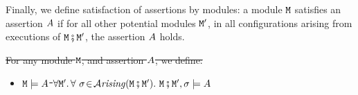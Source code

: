 Finally, we define satisfaction of assertions by modules: a module
${\mbox{\tt{\ensuremath{{\mbox{\tt{M}}}}}}}$ satisfies an assertion $A$ if for all other potential modules ${\mbox{\tt{\ensuremath{{\mbox{\tt{M}}}}}}}'$, in all configurations arising from executions of ${\mbox{\tt{\ensuremath{{\mbox{\tt{M}}}}}}}\fatsemi{\mbox{\tt{\ensuremath{{\mbox{\tt{M}}}}}}}'$, the assertion $A$ holds.

\begin{definition}
\label{def:module_satisfies}
\sout{For any module ${\mbox{\tt{\ensuremath{{\mbox{\tt{M}}}}}}}$, and  assertion $A$, we define:}
\begin{itemize}
\item\sout{
${\mbox{\tt{\ensuremath{{\mbox{\tt{M}}}}}}} \models A$ \IFF  $\forall \M'.\, \forall \ \sigma\!\in\!\Arising{\M\mkpair\M'}.\   \M\mkpair\M', \sigma \models \A$}
\end{itemize}
\end{definition}


 




